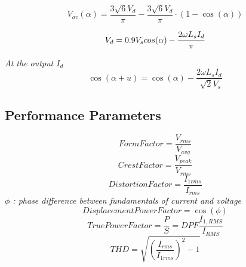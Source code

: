 \documentclass[twocolumn, ]{article}
\begin{document}
\begin{equation*}
	V_{av}(\alpha)=\frac{3 \sqrt{6} V_{d}}{\pi }-\frac{ 3 \sqrt{6} V_{d}}{\pi }\cdot (1-\cos(\alpha))
\end{equation*}

\begin{equation*}
	V_d = 0.9 V_s cos(\alpha) - \dfrac{2\omega L_s I_d}{\pi} \\
\end{equation*}

\textit{At the output $I_{d}$}
\begin{equation*}
	\cos(\alpha + u)=\cos(\alpha)-\dfrac{2\omega L_{s} I_{d}}{\sqrt[]{2}V_{s}}
\end{equation*}

\subsection{\small Performance Parameters}
\begin{equation}
Form Factor=\frac{V_{rms}}{V_{avg}}
\end{equation}
\begin{equation}
Crest Factor=\frac{V_{peak}}{V_{rms}}
\end{equation}
\begin{equation}
Distortion Factor=\frac{I_{1rms}}{I_{rms}}
\end{equation}
\textit{$\phi$ : phase difference between fundamentals of current and voltage}
\begin{equation}
Displacement Power Factor=\cos(\phi)
\end{equation}
\begin{equation}
True Power Factor=\frac{P}{S}=DPF \frac{I_{1,RMS}}{I_{RMS}}
\end{equation}
\begin{equation}
THD=\sqrt{(\frac{I_{rms}}{I_{1rms}})^2-1}
\end{equation}
\end{document}
